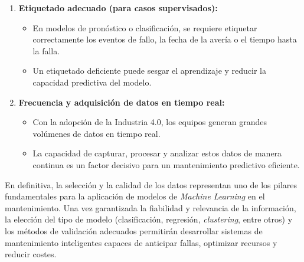\begin{enumerate}
    \item \textbf{Etiquetado adecuado (para casos supervisados):}
        \begin{itemize}
            \item En modelos de pronóstico o clasificación, se requiere etiquetar correctamente los eventos de fallo, la fecha de la avería o el tiempo hasta la falla.
            \item Un etiquetado deficiente puede sesgar el aprendizaje y reducir la capacidad predictiva del modelo.
        \end{itemize}

    \item \textbf{Frecuencia y adquisición de datos en tiempo real:}
        \begin{itemize}
            \item Con la adopción de la Industria 4.0, los equipos generan grandes volúmenes de datos en tiempo real.
            \item La capacidad de capturar, procesar y analizar estos datos de manera continua es un factor decisivo para un mantenimiento predictivo eficiente.
        \end{itemize}
\end{enumerate}

En definitiva, la selección y la calidad de los datos representan uno de los pilares fundamentales para la aplicación de modelos de \textit{Machine Learning} en el mantenimiento. Una vez garantizada la fiabilidad y relevancia de la información, la elección del tipo de modelo (clasificación, regresión, \textit{clustering}, entre otros) y los métodos de validación adecuados permitirán desarrollar sistemas de mantenimiento inteligentes capaces de anticipar fallas, optimizar recursos y reducir costes.




%
%
